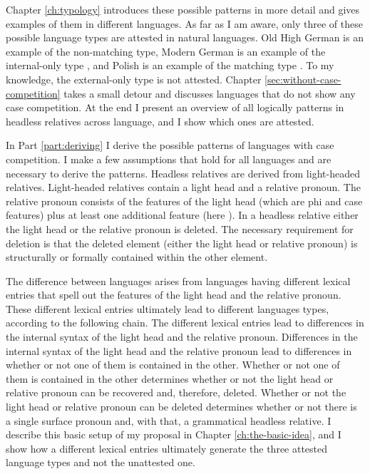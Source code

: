 Chapter \ref{ch:typology} introduces these possible patterns in more detail and gives examples of them in different languages. As far as I am aware, only three of these possible language types are attested in natural languages. Old High German is an example of the non-matching type, Modern German is an example of the internal-only type \citep{vogel2001}, and Polish is an example of the matching type \citep{citko2013}. To my knowledge, the external-only type is not attested.
Chapter \ref{sec:without-case-competition} takes a small detour and discusses languages that do not show any case competition. At the end I present an overview of all logically patterns in headless relatives across language, and I show which ones are attested.

In Part \ref{part:deriving} I derive the possible patterns of languages with case competition.
I make a few assumptions that hold for all languages and are necessary to derive the patterns. Headless relatives are derived from light-headed relatives. Light-headed relatives contain a light head and a relative pronoun. The relative pronoun consists of the features of the light head (which are phi and case features) plus at least one additional feature (here ). In a headless relative either the light head or the relative pronoun is deleted. The necessary requirement for deletion is that the deleted element (either the light head or relative pronoun) is structurally or formally contained within the other element.

The difference between languages arises from languages having different lexical entries that spell out the features of the light head and the relative pronoun. These different lexical entries ultimately lead to different languages types, according to the following chain.
The different lexical entries lead to differences in the internal syntax of the light head and the relative pronoun.
Differences in the internal syntax of the light head and the relative pronoun lead to differences in whether or not one of them is contained in the other.
Whether or not one of them is contained in the other determines whether or not the light head or relative pronoun can be recovered and, therefore, deleted.
Whether or not the light head or relative pronoun can be deleted determines whether or not there is a single surface pronoun and, with that, a grammatical headless relative.
I describe this basic setup of my proposal in Chapter \ref{ch:the-basic-idea}, and I show how a different lexical entries ultimately generate the three attested language types and not the unattested one.

